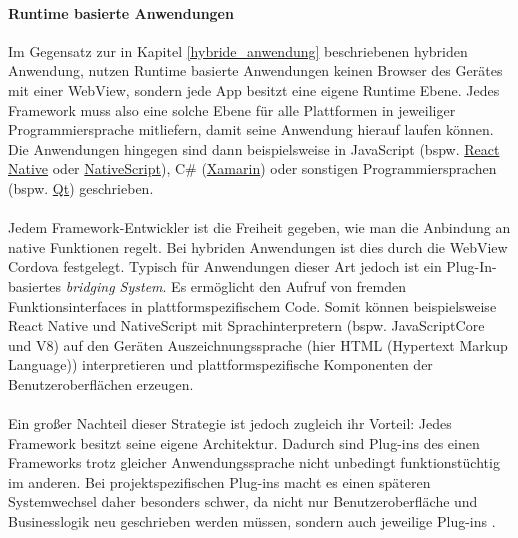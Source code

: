 \paragraph{Runtime basierte Anwendungen}
\label{runtime_based_apps}
Im Gegensatz zur in Kapitel \ref{hybride_anwendung} beschriebenen hybriden Anwendung, nutzen Runtime basierte Anwendungen keinen Browser des Gerätes mit einer WebView, sondern jede App besitzt eine eigene Runtime Ebene. 
Jedes Framework muss also eine solche Ebene für alle Plattformen in jeweiliger Programmiersprache mitliefern, damit seine Anwendung hierauf laufen können.
Die Anwendungen hingegen sind dann beispielsweise in JavaScript (bspw. \href{https://reactnative.dev/}{React Native} oder \href{https://nativescript.org/}{NativeScript}), C\# (\href{https://dotnet.microsoft.com/apps/xamarin}{Xamarin}) oder sonstigen Programmiersprachen (bspw. \href{https://www.qt.io/}{Qt}) geschrieben.\\
\\
Jedem Framework-Entwickler ist die Freiheit gegeben, wie man die Anbindung an native Funktionen regelt. Bei hybriden Anwendungen ist dies durch die WebView Cordova festgelegt.
Typisch für Anwendungen dieser Art jedoch ist ein Plug-In-basiertes \textit{bridging System}. Es ermöglicht den Aufruf von fremden Funktionsinterfaces in plattformspezifischem Code.
Somit können beispielsweise React Native und NativeScript mit Sprachinterpretern (bspw. JavaScriptCore und V8) auf den Geräten Auszeichnungssprache (hier HTML (Hypertext Markup Language)) interpretieren und plattformspezifische Komponenten der Benutzeroberflächen erzeugen.\\
\\
Ein großer Nachteil dieser Strategie ist jedoch zugleich ihr Vorteil: Jedes Framework besitzt seine eigene Architektur. Dadurch sind Plug-ins des einen Frameworks trotz gleicher Anwendungssprache nicht unbedingt funktionstüchtig im anderen. 
Bei projektspezifischen Plug-ins macht es einen späteren Systemwechsel daher besonders schwer, da nicht nur Benutzeroberfläche und Businesslogik neu geschrieben werden müssen, sondern auch jeweilige Plug-ins \cite{bjorn-hansen2020}.

